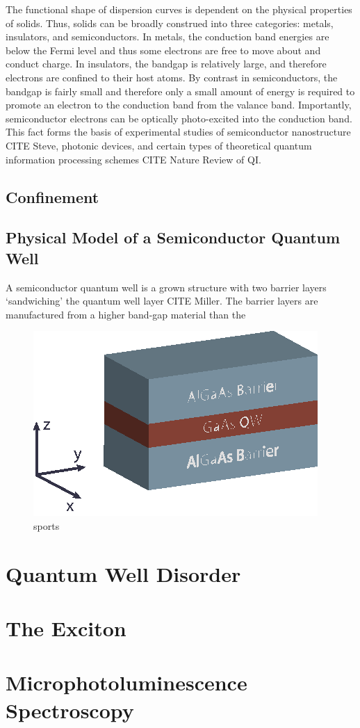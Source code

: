 The functional shape of dispersion curves is dependent on the physical properties of solids. Thus, solids can be broadly construed into three categories: metals, insulators, and semiconductors. In metals, the conduction band energies are below the Fermi level and thus some electrons are free to move about and conduct charge. In insulators, the bandgap is relatively large, and therefore electrons are confined to their host atoms. By contrast in semiconductors, the bandgap is fairly small and therefore only a small amount of energy is required to promote an electron to the conduction band from the valance band. Importantly, semiconductor electrons can be optically photo-excited into the conduction band. This fact forms the basis of experimental studies of semiconductor nanostructure CITE Steve, photonic devices, and certain types of theoretical quantum information processing schemes CITE Nature Review of QI.

\subsection{Confinement}
\subsection{Physical Model of a Semiconductor Quantum Well}
A semiconductor quantum well is a grown structure with two barrier layers `sandwiching' the quantum well layer CITE Miller. The barrier layers are manufactured from a higher band-gap material than the 
\begin{figure}[h!]
\centering
\includegraphics[width = .5\textwidth]{Well.eps}
\caption{sports}
\end{figure}

\section{Quantum Well Disorder}


\section{The Exciton}


\section{Microphotoluminescence Spectroscopy}